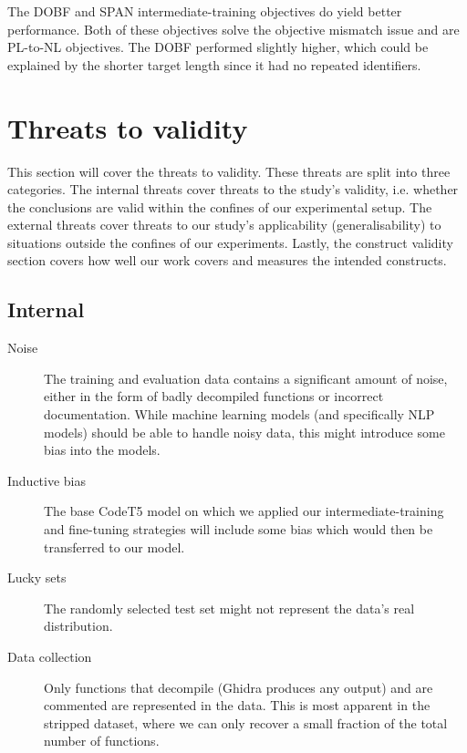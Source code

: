 The DOBF and SPAN intermediate-training objectives do yield better performance. Both of these objectives solve the objective mismatch issue and are PL-to-NL objectives. The DOBF performed slightly higher, which could be explained by the shorter target length since it had no repeated identifiers.

\section{Threats to validity}

This section will cover the threats to validity. These threats are split into three categories. The internal threats cover threats to the study's validity, i.e. whether the conclusions are valid within the confines of our experimental setup. The external threats cover threats to our study's applicability (generalisability) to situations outside the confines of our experiments. Lastly, the construct validity section covers how well our work covers and measures the intended constructs.
\subsection{Internal}
    \begin{description}
        \item[Noise] The training and evaluation data contains a significant amount of noise, either in the form of badly decompiled functions or incorrect documentation. While machine learning models (and specifically NLP models) should be able to handle noisy data, this might introduce some bias into the models.
        \item[Inductive bias] The base CodeT5 model on which we applied our intermediate-training and fine-tuning strategies will include some bias which would then be transferred to our model.
        \item[Lucky sets] The randomly selected test set might not represent the data's real distribution.
        \item[Data collection] Only functions that decompile (Ghidra produces any output) and are commented are represented in the data. This is most apparent in the stripped dataset, where we can only recover a small fraction of the total number of functions. 
    \end{description}
